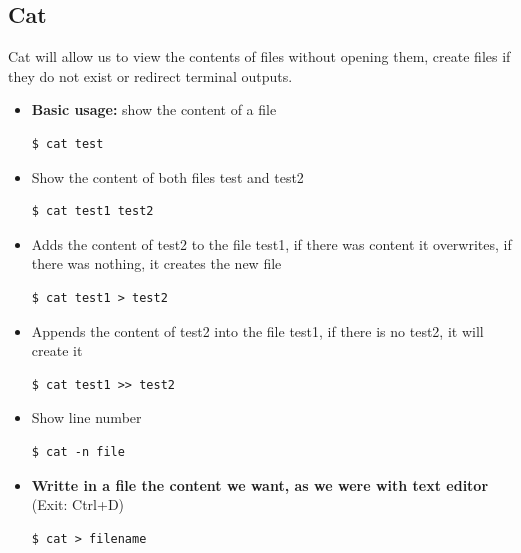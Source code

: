 \documentclass{article}
\newenvironment{codetemplate}[1][]{%
  \mybasecolorbox[#1]
  \itshape
}{%
  \endmybasecolorbox
}
\begin{document}
\subsection{Cat}
Cat will allow us to view the contents of files without opening them, create files if they do not exist or redirect terminal outputs.

\begin{itemize}
    \item \textbf{Basic usage:} show the content of a file
\begin{codetemplate}{}
\begin{verbatim}
$ cat test
\end{verbatim}
\end{codetemplate}

    \item Show the content of both files test and test2
\begin{codetemplate}{}
\begin{verbatim}
$ cat test1 test2
\end{verbatim}
\end{codetemplate}

    \item Adds the content of test2 to the file test1, if there was content it overwrites, if there was nothing, it creates the new file
\begin{codetemplate}{}
\begin{verbatim}
$ cat test1 > test2
\end{verbatim}
\end{codetemplate}

    \item Appends the content of test2 into the file test1, if there is no test2, it will create it
\begin{codetemplate}{}
\begin{verbatim}
$ cat test1 >> test2
\end{verbatim}
\end{codetemplate}

    \item Show line number
\begin{codetemplate}{}
\begin{verbatim}
$ cat -n file
\end{verbatim}
\end{codetemplate}

    \item \textbf{Writte in a file the content we want, as we were with text editor} (Exit: Ctrl+D)
\begin{codetemplate}{}
\begin{verbatim}
$ cat > filename
\end{verbatim}
\end{codetemplate}
\end{itemize}
\end{document}

